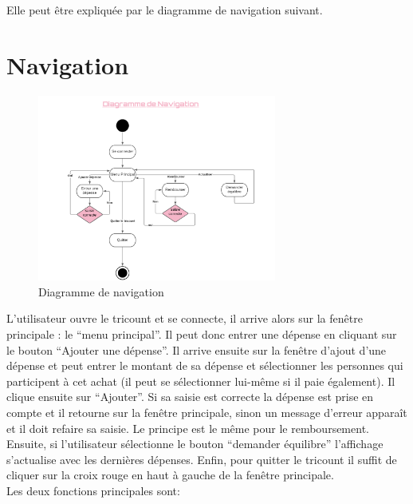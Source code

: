 \documentclass[12,french]{report}
\begin{document}
Elle peut être expliquée par le diagramme de navigation suivant.

\section{Navigation}

\begin{figure}[H]
	\center
	\includegraphics[width=0.7\textwidth]{./Images/Navigation}
	\caption{Diagramme de navigation}
\end{figure}\vspace{0.2cm}

L’utilisateur ouvre le tricount et se connecte, il arrive alors sur la fenêtre principale : le “menu principal”. Il peut donc entrer une dépense en cliquant sur le bouton “Ajouter une dépense”. Il arrive ensuite sur la fenêtre d’ajout d’une dépense et peut entrer le montant de sa dépense et sélectionner les personnes qui participent à cet achat (il peut se sélectionner lui-même si il paie également). Il clique ensuite sur “Ajouter”. Si sa saisie est correcte la dépense est prise en compte et il retourne sur la fenêtre principale, sinon un message d’erreur apparaît et il doit refaire sa saisie.
Le principe est le même pour le remboursement.
Ensuite, si l’utilisateur sélectionne le bouton “demander équilibre” l’affichage s’actualise avec les dernières dépenses.
Enfin, pour quitter le tricount il suffit de cliquer sur la croix rouge en haut à gauche de la fenêtre principale.\\

Les deux fonctions principales sont:\\
\end{document}
